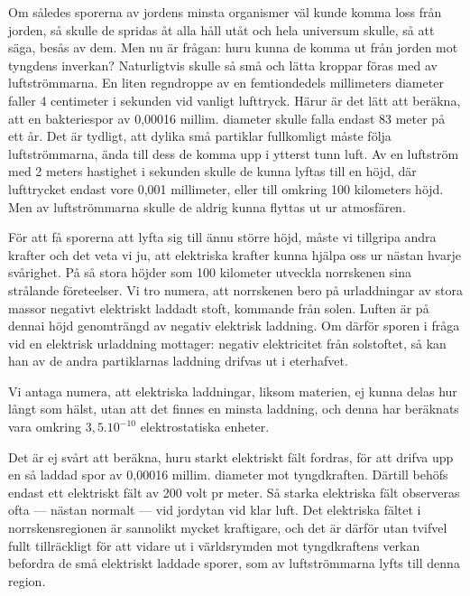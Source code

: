 \documentclass[a4paper, 12pt, oneside, swedish]{article}
\begin{document}
Om således sporerna av jordens minsta organismer väl kunde komma loss från jorden, så skulle de spridas åt alla håll utåt och hela universum skulle, så att säga, besås av dem. Men nu är frågan: huru kunna de komma ut från jorden mot tyngdens inverkan? Naturligtvis skulle så små och lätta kroppar föras med av luftströmmarna. En liten regndroppe av en femtiondedels millimeters diameter faller 4 centimeter i sekunden vid vanligt lufttryck. Härur är det lätt att beräkna, att en bakteriespor av 0,00016 millim. diameter skulle falla endast 83 meter på ett år. Det är tydligt, att dylika små partiklar fullkomligt måste följa luftströmmarna, ända till dess de komma upp i ytterst tunn luft. Av en luftström med 2 meters hastighet i sekunden skulle de kunna lyftas till en höjd, där lufttrycket endast vore 0,001 millimeter, eller till omkring 100 kilometers höjd. Men av luftströmmarna skulle de aldrig kunna flyttas ut ur atmosfären.

För att få sporerna att lyfta sig till ännu större höjd, måste vi tillgripa andra krafter och det veta vi ju, att elektriska krafter kunna hjälpa oss ur nästan hvarje svårighet. På så stora höjder som 100 kilometer utveckla norrskenen sina strålande företeelser. Vi tro numera, att norrskenen bero på urladdningar av stora massor negativt elektriskt laddadt stoft, kommande från solen. Luften är på dennai höjd genomträngd av negativ elektrisk laddning. Om därför sporen i fråga vid en elektrisk urladdning mottager: negativ elektricitet från solstoftet, så kan han av de andra partiklarnas laddning drifvas ut i eterhafvet.

Vi antaga numera, att elektriska laddningar, liksom materien, ej kunna delas hur långt som hälst, utan att det finnes en minsta laddning, och denna har beräknats vara omkring $3,5.10^{-10}$ elektrostatiska enheter.

Det är ej svårt att beräkna, huru starkt elektriskt fält fordras, för att drifva upp en så laddad spor av 0,00016 millim. diameter mot tyngdkraften. Därtill behöfs endast ett elektriskt fält av 200 volt pr meter. Så starka elektriska fält observeras ofta --- nästan normalt --- vid jordytan vid klar luft. Det elektriska fältet i norrskensregionen är sannolikt mycket kraftigare, och det är därför utan tvifvel fullt tillräckligt för att vidare ut i världsrymden mot tyngdkraftens verkan befordra de små elektriskt laddade sporer, som av luftströmmarna lyfts till denna region.
\end{document}
